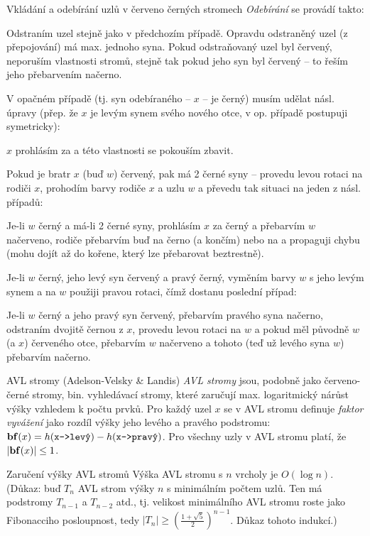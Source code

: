 \begin{algoritmusN}{Vkládání a odebírání uzlů v červeno černých stromech}
\emph{Odebírání} se provádí takto:
\begin{pitemize}
    \item Odstraním uzel stejně jako v předchozím případě. Opravdu odstraněný uzel (z přepojování) má max. jednoho syna. Pokud odstraňovaný uzel byl červený, neporuším vlastnosti stromů, stejně tak pokud jeho syn byl červený -- to řeším jeho přebarvením načerno.
    \item V opačném případě (tj. syn odebíraného -- $x$ -- je černý) musím udělat násl. úpravy (přep. že $x$ je levým synem svého nového otce, v op. případě postupuji symetricky):
    \item $x$ prohlásím za  a této vlastnosti se pokouším zbavit.
    \item Pokud je bratr $x$ (buď $w$) červený, pak má 2 černé syny -- provedu levou rotaci na rodiči $x$, prohodím barvy rodiče $x$ a uzlu $w$ a převedu tak situaci na jeden z násl. případů:
    \item Je-li $w$ černý a má-li 2 černé syny, prohlásím $x$ za černý a přebarvím $w$ načerveno, rodiče přebarvím buď na černo (a končím) nebo na  a propaguji chybu (mohu dojít až do kořene, který lze přebarovat beztrestně).
    \item Je-li $w$ černý, jeho levý syn červený a pravý černý, vyměním barvy $w$ s jeho levým synem a na $w$ použiji pravou rotaci, čímž dostanu poslední případ:
    \item Je-li $w$ černý a jeho pravý syn červený, přebarvím pravého syna načerno, odstraním dvojitě černou z $x$, provedu levou rotaci na $w$ a pokud měl původně $w$ (a $x$) červeného otce, přebarvím $w$ načerveno a tohoto (teď už levého syna $w$) přebarvím načerno.
\end{pitemize}
\end{algoritmusN}


\begin{definiceN}{AVL stromy (Adelson-Velsky \& Landis)}
\emph{AVL stromy} jsou, podobně jako červeno-černé stromy, bin. vyhledávací stromy, které zaručují max. logaritmický nárůst výšky vzhledem k počtu prvků. Pro každý uzel $x$ se v AVL stromu definuje \emph{faktor vyvážení} jako rozdíl výšky jeho levého a pravého podstromu: $\mathbf{bf}(x) = h(\texttt{x->levý}) - h(\texttt{x->pravý})$. Pro všechny uzly v AVL stromu platí, že $|\mathbf{bf}(x)|\leq 1$.
\end{definiceN}

\begin{vetaN}{Zaručení výšky AVL stromů}
Výška AVL stromu s $n$ vrcholy je $O(\log n)$. (Důkaz: buď $T_n$ AVL strom výšky $n$ s minimálním počtem uzlů. Ten má podstromy $T_{n-1}$ a $T_{n-2}$ atd., tj. velikost minimálního AVL stromu roste jako Fibonacciho posloupnost, tedy $|T_n|\geq (\frac{1+\sqrt{5}}{2})^{n-1}$. Důkaz tohoto indukcí.)
\end{vetaN}


